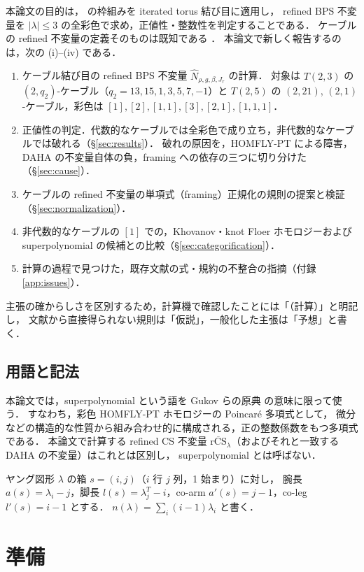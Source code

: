 \documentclass[11pt,a4paper]{ltjsarticle}
\theoremstyle{definition}
\theoremstyle{remark}
\newcommand{\rCS}{\overline{\mathrm{rCS}}}
\newcommand{\hN}{\widehat{N}}
\begin{document}
本論文の目的は，\cite{KN} の枠組みを iterated torus 結び目に適用し，
refined BPS 不変量を $|\lambda|\le3$ の全彩色で求め，正値性・整数性を判定することである．
ケーブルの refined 不変量の定義そのものは既知である \cite{CD14}．
本論文で新しく報告するのは，次の (i)--(iv) である．
\begin{enumerate}
\item ケーブル結び目の refined BPS 不変量 $\hN_{\rho,g,\beta,J_r}$ の計算．
  対象は $T(2,3)$ の $(2,q_2)$-ケーブル（$q_2=13,15,1,3,5,7,-1$）と $T(2,5)$ の $(2,21)$, $(2,1)$-ケーブル，彩色は $[1],[2],[1,1],[3],[2,1],[1,1,1]$．
\item 正値性の判定．代数的なケーブルでは全彩色で成り立ち，非代数的なケーブルでは破れる（\S\ref{sec:results}）．
  破れの原因を，HOMFLY-PT による障害，DAHA の不変量自体の負，framing への依存の三つに切り分けた（\S\ref{sec:cause}）．
\item ケーブルの refined 不変量の単項式（framing）正規化の規則の提案と検証（\S\ref{sec:normalization}）．
\item 非代数的なケーブルの $[1]$ での，Khovanov・knot Floer ホモロジーおよび superpolynomial の候補との比較（\S\ref{sec:categorification}）．
\item 計算の過程で見つけた，既存文献の式・規約の不整合の指摘（付録 \ref{app:issues}）．
\end{enumerate}

主張の確からしさを区別するため，計算機で確認したことには「（計算）」と明記し，
文献から直接得られない規則は「仮説」，一般化した主張は「予想」と書く．

\subsection{用語と記法}

本論文では，superpolynomial という語を Gukov らの原典 \cite{DGR,GS} の意味に限って使う．
すなわち，彩色 HOMFLY-PT ホモロジーの Poincaré 多項式として，
微分などの構造的な性質から組み合わせ的に構成される，正の整数係数をもつ多項式である．
本論文で計算する refined CS 不変量 $\rCS_\lambda$（およびそれと一致する DAHA の不変量）はこれとは区別し，
superpolynomial とは呼ばない．

ヤング図形 $\lambda$ の箱 $s=(i,j)$（$i$ 行 $j$ 列，1 始まり）に対し，
腕長 $a(s)=\lambda_i-j$，脚長 $l(s)=\lambda^T_j-i$，co-arm $a'(s)=j-1$，co-leg $l'(s)=i-1$ とする．
$n(\lambda)=\sum_i(i-1)\lambda_i$ と書く．

\section{準備}
\end{document}
